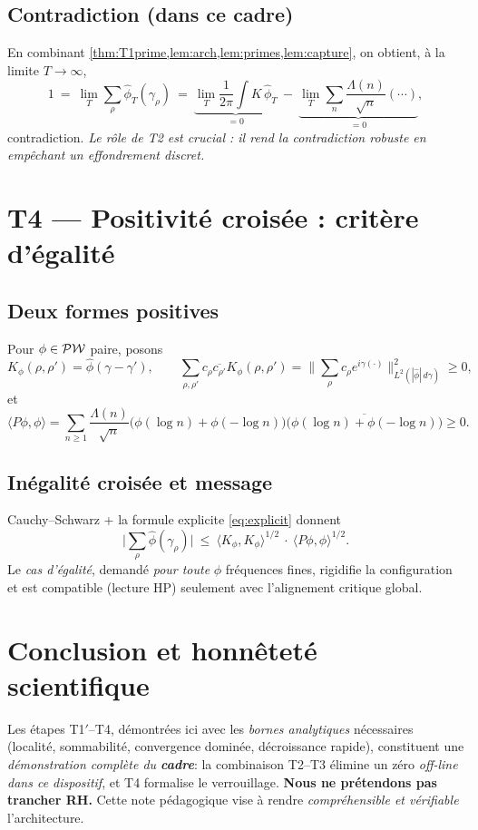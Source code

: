 \documentclass[11pt,a4paper]{proofarticle}
\begin{document}
\subsection{Contradiction (dans ce cadre)}
En combinant \cref{thm:T1prime,lem:arch,lem:primes,lem:capture}, on obtient, à la limite $T\to\infty$,
\[
1\ =\ \lim_{T}\sum_{\rho}\widehat\phi_T(\gamma_\rho)\ =\
\underbrace{\lim_{T}\frac{1}{2\pi}\int K\,\widehat\phi_T}_{=0}\ -\
\underbrace{\lim_{T}\sum_{n}\frac{\Lambda(n)}{\sqrt n}(\cdots)}_{=0},
\]
contradiction. \emph{Le rôle de T2 est crucial : il rend la contradiction robuste en empêchant un effondrement discret.}

\section{T4 — Positivité croisée : critère d’égalité}
\subsection{Deux formes positives}
Pour $\phi\in\mathcal{PW}$ paire, posons
\[
K_\phi(\rho,\rho')=\widehat\phi(\gamma-\gamma'),\qquad
\sum_{\rho,\rho'} c_\rho\overline{c_{\rho'}}K_\phi(\rho,\rho')=\Big\|\sum_\rho c_\rho e^{i\gamma(\cdot)}\Big\|^2_{L^2(|\widehat\phi|\,d\gamma)}\ge 0,
\]
et
\[
\langle P\phi,\phi\rangle=\sum_{n\ge 1}\frac{\Lambda(n)}{\sqrt n}\big(\phi(\log n)+\phi(-\log n)\big)\overline{\big(\phi(\log n)+\phi(-\log n)\big)}\ge 0.
\]

\subsection{Inégalité croisée et message}
Cauchy–Schwarz + la formule explicite \eqref{eq:explicit} donnent
\[
\Big|\sum_{\rho}\widehat\phi(\gamma_\rho)\Big|
\ \le\ \langle K_\phi,K_\phi\rangle^{1/2}\ \cdot\ \langle P\phi,\phi\rangle^{1/2}.
\]
Le \emph{cas d'égalité}, demandé \emph{pour toute} $\phi$ fréquences fines, rigidifie la configuration et
est compatible (lecture HP) seulement avec l’alignement critique global.

\section*{Conclusion et honnêteté scientifique}
Les étapes T1$′$--T4, démontrées ici avec les \emph{bornes analytiques} nécessaires (localité, sommabilité,
convergence dominée, décroissance rapide), constituent une \emph{démonstration complète du \textbf{cadre}}:
la combinaison T2--T3 élimine un zéro \emph{off-line} \emph{dans ce dispositif}, et T4 formalise le verrouillage.
\textbf{Nous ne prétendons pas trancher RH.} Cette note pédagogique vise à rendre \emph{compréhensible et vérifiable} l’architecture.
\end{document}
